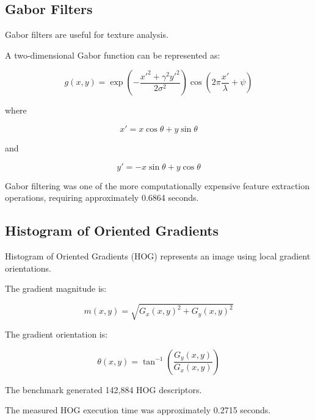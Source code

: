 \documentclass[11pt,a4paper]{article}
\begin{document}
\subsection{Gabor Filters}

Gabor filters are useful for texture analysis.

A two-dimensional Gabor function can be represented as:

\begin{equation}
g(x,y)=
\exp
\left(
-\frac{x'^2+\gamma^2y'^2}{2\sigma^2}
\right)
\cos
\left(
2\pi\frac{x'}{\lambda}+\psi
\right)
\end{equation}

where

\begin{equation}
x'=x\cos\theta+y\sin\theta
\end{equation}

and

\begin{equation}
y'=-x\sin\theta+y\cos\theta
\end{equation}

Gabor filtering was one of the more computationally expensive feature extraction operations, requiring approximately 0.6864 seconds.


\subsection{Histogram of Oriented Gradients}

Histogram of Oriented Gradients (HOG) represents an image using local gradient orientations.

The gradient magnitude is:

\begin{equation}
m(x,y)=
\sqrt{
G_x(x,y)^2+G_y(x,y)^2
}
\end{equation}

The gradient orientation is:

\begin{equation}
\theta(x,y)=
\tan^{-1}
\left(
\frac{G_y(x,y)}{G_x(x,y)}
\right)
\end{equation}

The benchmark generated 142,884 HOG descriptors.

The measured HOG execution time was approximately 0.2715 seconds.

\end{document}
